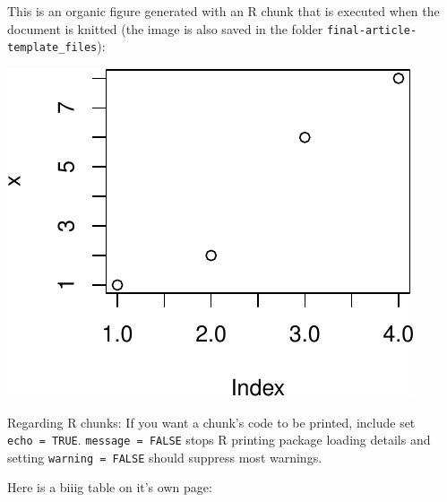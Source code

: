 \documentclass[12pt,preprint, authoryear]{article}
\numberwithin{equation}{section}
\numberwithin{figure}{section}
\numberwithin{table}{section}
\begin{document}
This is an organic figure generated with an R chunk that is executed
when the document is knitted (the image is also saved in the folder
\texttt{final-article-template\_files}):

\begin{center}\includegraphics[width=0.4\linewidth]{final-article_files/figure-latex/unnamed-chunk-2-1} \end{center}

Regarding R chunks: If you want a chunk's code to be printed, include
set \texttt{echo\ =\ TRUE}. \texttt{message\ =\ FALSE} stops R printing
package loading details and setting \texttt{warning\ =\ FALSE} should
suppress most warnings.

Here is a biiig table on it's own page:

\scriptsize
\end{document}

